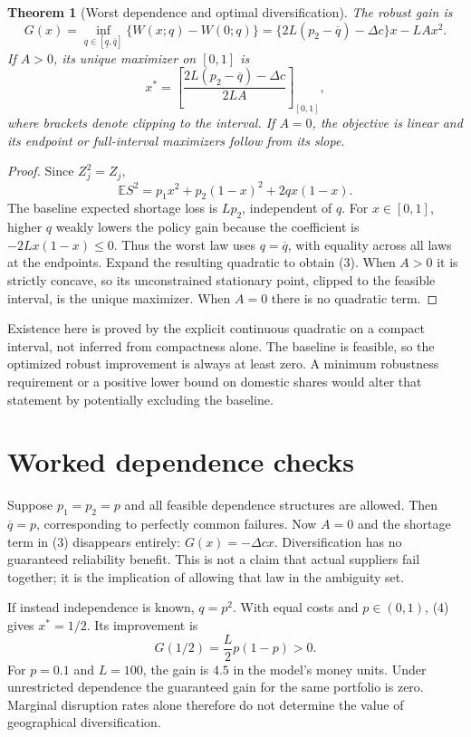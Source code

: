 \documentclass[11pt,a4paper]{article}
\newtheorem{theorem}{Theorem}[section]
\newcommand{\E}{\mathbb E}
\begin{document}
\begin{theorem}[Worst dependence and optimal diversification]
The robust gain is
\[
 G(x)=\inf_{q\in[\underline q,\overline q]}
       \{W(x;q)-W(0;q)\}
 =\{2L(p_2-\overline q)-\Delta c\}x-LAx^2.                \tag{3}
\]
If $A>0$, its unique maximizer on $[0,1]$ is
\[
 x^*=\left[\frac{2L(p_2-\overline q)-\Delta c}{2LA}
       \right]_{[0,1]},                                  \tag{4}
\]
where brackets denote clipping to the interval. If $A=0$, the objective is linear and its endpoint or full-interval maximizers follow from its slope.
\end{theorem}
\begin{proof}
Since $Z_j^2=Z_j$,
\[
 \E S^2=p_1x^2+p_2(1-x)^2+2qx(1-x).
\]
The baseline expected shortage loss is $Lp_2$, independent of $q$. For $x\in[0,1]$, higher $q$ weakly lowers the policy gain because the coefficient is $-2Lx(1-x)\le0$. Thus the worst law uses $q=\overline q$, with equality across all laws at the endpoints. Expand the resulting quadratic to obtain (3). When $A>0$ it is strictly concave, so its unconstrained stationary point, clipped to the feasible interval, is the unique maximizer. When $A=0$ there is no quadratic term.
\end{proof}

Existence here is proved by the explicit continuous quadratic on a compact interval, not inferred from compactness alone. The baseline is feasible, so the optimized robust improvement is always at least zero. A minimum robustness requirement or a positive lower bound on domestic shares would alter that statement by potentially excluding the baseline.

\section{Worked dependence checks}
Suppose $p_1=p_2=p$ and all feasible dependence structures are allowed. Then $\overline q=p$, corresponding to perfectly common failures. Now $A=0$ and the shortage term in (3) disappears entirely: $G(x)=-\Delta c x$. Diversification has no guaranteed reliability benefit. This is not a claim that actual suppliers fail together; it is the implication of allowing that law in the ambiguity set.

If instead independence is known, $q=p^2$. With equal costs and $p\in(0,1)$, (4) gives $x^*=1/2$. Its improvement is
\[
 G(1/2)=\frac L2p(1-p)>0.                                \tag{5}
\]
For $p=0.1$ and $L=100$, the gain is $4.5$ in the model's money units. Under unrestricted dependence the guaranteed gain for the same portfolio is zero. Marginal disruption rates alone therefore do not determine the value of geographical diversification.
\end{document}
